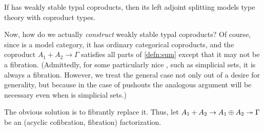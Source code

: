 \documentclass[referee]{psp}
\begin{document}
\begin{thm}
  If \sM has weakly stable typal coproducts, then its left adjoint splitting models type theory with coproduct types.
\end{thm}

Now, how do we actually \emph{construct} weakly stable typal coproducts?
Of course, since \sM is a model category, it has ordinary categorical coproducts, and the coproduct $A_1 + A_2 \to \Gamma$ satisfies all parts of \cref{defn:sum} except that it may not be a fibration.
(Admittedly, for some particularly nice \sM, such as simplicial sets, it is always a fibration.
However, we treat the general case not only out of a desire for generality, but because in the case of pushouts the analogous argument will be necessary even when \sM is simplicial sets.)

The obvious solution is to fibrantly replace it.
Thus, let $A_1 + A_2 \to A_1\oplus A_2 \twoheadrightarrow \Gamma$ be an (acyclic cofibration, fibration) factorization.
\end{document}
